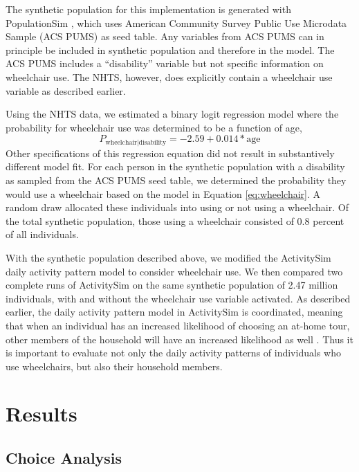 \documentclass[3p, authoryear, review]{elsarticle} %
\begin{document}
The synthetic population for this implementation is generated with PopulationSim
\citep{paul2018}, which uses American Community Survey Public Use Microdata Sample
(ACS PUMS)\citep{acspums} as seed table. Any variables from ACS PUMS can in principle
be included in synthetic population and therefore in the model. The ACS PUMS
includes a ``disability'' variable but not specific information on wheelchair use.
The NHTS, however, does explicitly contain a wheelchair use variable as
described earlier.

Using the NHTS data, we estimated a binary logit regression model where the
probability for wheelchair use was determined to be a function of age,
\begin{equation}
  P_{\mathrm{wheelchair | disability}}=-2.59 + 0.014*\mathrm{age}
  \label{eq:wheelchair}
\end{equation}
Other specifications of this regression equation did not result in substantively
different model fit. For each person in the synthetic population with a disability
as sampled from the ACS PUMS seed table, we determined the probability they
would use a wheelchair based on the model in Equation \eqref{eq:wheelchair}. A random
draw allocated these individuals into using or not using a wheelchair.
Of the total synthetic population, those using a wheelchair consisted of 0.8
percent of all individuals.

With the synthetic population described above, we modified the ActivitySim
daily activity pattern model to consider wheelchair use. We then compared two
complete runs of ActivitySim on the same synthetic population of 2.47 million
individuals, with and without the wheelchair use variable activated. As described
earlier, the daily activity pattern model in ActivitySim is coordinated, meaning
that when an individual has an increased likelihood of choosing an at-home tour,
other members of the household will have an increased likelihood as well \citep{Bradley2005}.
Thus it is important to evaluate not only the daily activity patterns of
individuals who use wheelchairs, but also their household members.

\hypertarget{results}{%
\section{Results}\label{results}}

\hypertarget{choice-analysis}{%
\subsection{Choice Analysis}\label{choice-analysis}}
\end{document}
